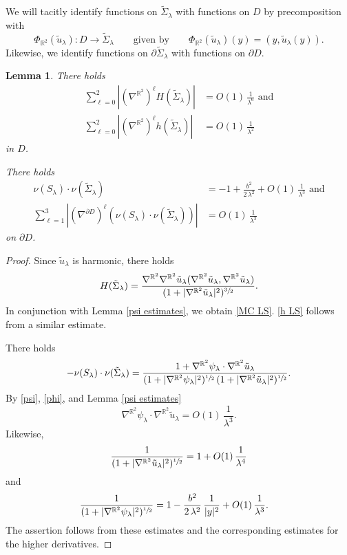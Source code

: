 \documentclass[11pt]{amsart}
\newtheorem{lem}[prop]{Lemma}
\begin{document}
We will tacitly identify functions  on $\tilde \Sigma_\lambda$ with functions  on $D$ by precomposition with  
$$\Phi_{\mathbb{R}^2}(\tilde u_\lambda):D\to \tilde \Sigma_\lambda\qquad\text{given by}\qquad  \Phi_{\mathbb{R}^2}(\tilde u_\lambda)(y)=(y,\tilde u_\lambda(y)).$$ Likewise, we identify functions on $\partial \tilde \Sigma_\lambda$ with functions on $\partial D$. 

\begin{lem} \label{MC and angle estimate}
There holds
\begin{align} \label{MC LS} 
	\sum_{\ell=0}^2|(\nabla^{\mathbb{R}^2})^\ell H(\tilde \Sigma_{\lambda})|&=O(1)\,\frac{1}{\lambda^6}\text{ and}\\ \label{h LS}
	\sum_{\ell=0}^2|(\nabla^{\mathbb{R}^2})^\ell h(\tilde \Sigma_{\lambda})|&=O(1)\,\frac{1}{\lambda^2}
\end{align}
 in $D$.

There holds
\begin{align*} 
\nu(S_\lambda)\cdot\nu(\tilde \Sigma_{\lambda })&=-1+\frac{b^2}{2\,\lambda^2}+O(1)\,\frac{1}{\lambda^3}\text{ and}\\
\sum_{\ell=1}^3|(\nabla^{\partial D})^\ell(\nu(S_\lambda)\cdot\nu(\tilde \Sigma_{\lambda }))|&=O(1)\,\frac{1}{\lambda^3}
\end{align*} 
on $\partial D$.
\end{lem}
\begin{proof}


	
	Since $\tilde u_\lambda$ is harmonic, there holds 
	$$
	H(\tilde \Sigma_\lambda)=\frac{\nabla^{\mathbb{R}^2}\nabla^{\mathbb{R}^2}\tilde u_\lambda(\nabla^{\mathbb{R}^2} \tilde u_\lambda, \nabla^{\mathbb{R}^2} \tilde u_\lambda)}{(1+|\nabla^{\mathbb{R}^2}\tilde u_\lambda|^2)^{\sfrac32}}.
	$$
In conjunction with Lemma \ref{psi estimates}, we obtain \eqref{MC LS}. \eqref{h LS} follows from a similar estimate.

There holds
	$$
-\nu(S_\lambda)\cdot \nu(\tilde \Sigma_{\lambda})=\frac{1+\nabla^{\mathbb{R}^2}\psi_{\lambda}\cdot \nabla^{\mathbb{R}^2}\tilde u_{\lambda}}{(1+|\nabla^{\mathbb{R}^2}\psi_\lambda|^2)^{\sfrac12}\,(1+|\nabla^{\mathbb{R}^2}\tilde u_{\lambda}|^2)^{\sfrac12}}. 
	$$
By \eqref{psi}, \eqref{phi}, and Lemma \ref{psi estimates}
	$$
	\nabla^{\mathbb{R}^2}\psi_{\lambda}\cdot \nabla^{\mathbb{R}^2}\tilde u_{\lambda}=O(1)\,\frac{1}{\lambda^3}.
	$$
Likewise, 
	$$
\frac{1}{(1+|\nabla^{\mathbb{R}^2}\tilde u_{\lambda}|^2)^{\sfrac12}}=1+O(1)\,\frac{1}{\lambda^4}
	$$
	and
	\begin{align*} 
	\frac{1}{(1+|\nabla^{\mathbb{R}^2}\psi_\lambda|^2)^{\sfrac12}}&=	1-\frac{b^2}{2\,\lambda^2}\,\frac{1}{|y|^2}+O(1)\,\frac{1}{\lambda^3}.
		\end{align*} 
	The assertion follows from these estimates and the corresponding estimates for the higher derivatives.
\end{proof}
\end{document}
